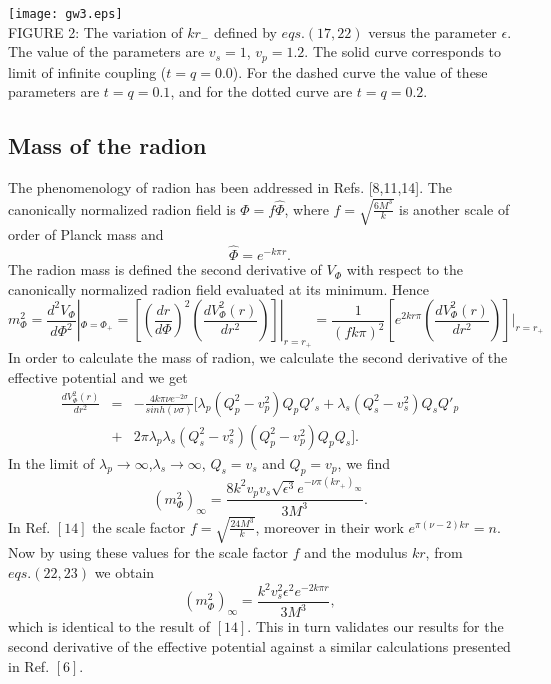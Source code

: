 \documentclass[12pt]{article}
\begin{document}
\begin{center}
  \texttt{[image: gw3.eps]}\\
  {\small {FIGURE 2: The variation of $kr_-$ defined by $eqs.(17,22)$ versus the
parameter $\epsilon$. The value of the parameters are
$v_s=1$, $v_p=1.2$. The solid curve corresponds to limit of
infinite coupling ($t=q=0.0$). For the dashed curve the value of
these parameters are $t=q=0.1$, and for the dotted curve are
$t=q=0.2$.}}\\
\end{center}


 \subsection {Mass of the radion} The
phenomenology of radion has been addressed in Refs. [8,11,14]. The
canonically normalized radion field is $\Phi=f \hat{\Phi}$, where $f
=\sqrt{ \frac{6M^3}{k}}$ is another scale of order of Planck mass
and
\begin{equation}
\hat{\Phi}=e^{-k\pi r}.
\end{equation}
The radion mass is defined the second derivative of $V_\Phi$ with
respect to the canonically normalized radion field evaluated at its
minimum. Hence
\begin{equation}
m^2_\Phi=\frac{d^2V_\Phi}{d\Phi^2}|_{\Phi=\Phi_+}=[(\frac{dr}{d\Phi})^2
(\frac{dV^2_{\Phi}(r)}{dr^2})]|_{r=r_+}
=\frac{1}{(fk\pi)^2}[e^{2kr\pi}(\frac{dV^2_{\Phi}(r)}{dr^2})]|_{r=r_+}
\end{equation}
In order to calculate the mass of radion, we calculate the second
derivative of the effective potential and we get
\begin{eqnarray}
\frac{dV^2_{\Phi}(r)}{dr^2}&=&-\frac{4k\pi\nu
e^{-2\sigma}}{sinh(\nu\sigma)}[\lambda_p(Q_p^2-v^2_p)Q_pQ'_s+
\lambda_s(Q_s^2-v^2_s)Q_sQ'_p
\nonumber\\
&+&2\pi\lambda_p\lambda_s(Q^2_s-v^2_s)(Q^2_p-v^2_p)Q_pQ_s].
\end{eqnarray}
In the limit of
$\lambda_p\rightarrow\infty$,$\lambda_s\rightarrow\infty$, $Q_s=v_s$
and $Q_p=v_p$,
 we find
\begin{equation}
(m^2_\Phi)_\infty=\frac{8k^2 v_p v_s \sqrt{\epsilon^3}e^{-\nu \pi
(kr_+)_\infty}}{3M^3}.
\end{equation}
In Ref. $[14]$ the scale factor $f=\sqrt{\frac{24M^3}{k}}$, moreover
in their work $e^{\pi(\nu-2) k r}=n$. Now by using these values for
the scale factor $f$ and the modulus $kr$,
 from $eqs.(22,23)$ we obtain
\begin{equation}
(m^2_\Phi)_\infty=\frac{k^2  v^2_s \epsilon^2e^{-2 k\pi r}}{3M^3},
\end{equation}
which is identical to the result of $[14]$. This in turn validates
our results for the second derivative of the effective potential
against a similar calculations presented in Ref. $[6]$.
\end{document}
